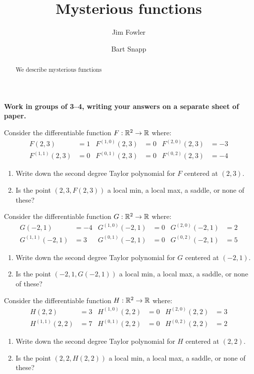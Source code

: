 \documentclass[handout,noauthor,nooutcomes]{ximera}
\author{Jim Fowler \and Bart Snapp}
\title{Mysterious functions}
\begin{document}
\begin{abstract}
  We describe  mysterious functions
\end{abstract}
\maketitle

\textbf{Work in groups of 3--4, writing your answers on a separate
  sheet of paper.}

\begin{problem}
Consider the differentiable function $F:\mathbb R^2\to\mathbb R$ where:
\begin{align*}
  F(2,3) &= 1        &  F^{(1,0)}(2,3) &= 0 & F^{(2,0)}(2,3) &= -3\\
  F^{(1,1)}(2,3) &=0 &  F^{(0,1)}(2,3) &= 0 & F^{(0,2)}(2,3) &= -4  
\end{align*}
\begin{enumerate}
\item Write down the second degree Taylor polynomial for $F$ centered at $(2,3)$.
\item Is the point $(2,3,F(2,3))$ a local min, a local max, a saddle,
  or none of these?
\end{enumerate}
\end{problem}


\begin{problem}
Consider the differentiable function $G:\mathbb R^2\to\mathbb R$ where:
\begin{align*}
  G(-2,1) &= -4       &  G^{(1,0)}(-2,1) &= 0 & G^{(2,0)}(-2,1) &= 2\\
  G^{(1,1)}(-2,1) &=3 &  G^{(0,1)}(-2,1) &= 0 & G^{(0,2)}(-2,1) &= 5  
\end{align*}
\begin{enumerate}
\item Write down the second degree Taylor polynomial for $G$ centered at $(-2,1)$.
\item Is the point $(-2,1,G(-2,1))$ a local min, a local max, a saddle,
  or none of these?
\end{enumerate}
\end{problem}


\begin{problem}
Consider the differentiable function $H:\mathbb R^2\to\mathbb R$ where:
\begin{align*}
  H(2,2) &= 3       &  H^{(1,0)}(2,2) &= 0 & H^{(2,0)}(2,2) &= 3\\
  H^{(1,1)}(2,2) &=7 &  H^{(0,1)}(2,2) &= 0 & H^{(0,2)}(2,2) &= 2  
\end{align*}
\begin{enumerate}
\item Write down the second degree Taylor polynomial for $H$ centered at $(2,2)$.
\item Is the point $(2,2,H(2,2))$ a local min, a local max, a saddle,
  or none of these?
\end{enumerate}
\end{problem}
\end{document}
